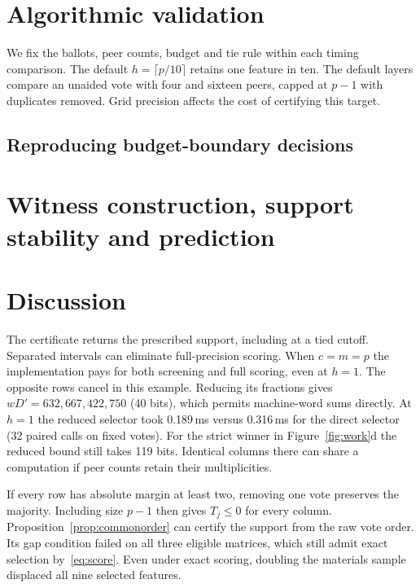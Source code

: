 \documentclass{article}
\begin{document}


\section{Algorithmic validation}
We fix the ballots, peer counts, budget and tie rule within each timing comparison. The default $h=\lceil p/10\rceil$ retains one feature in ten. The default layers compare an unaided vote with four and sixteen peers, capped at $p-1$ with duplicates removed. Grid precision affects the cost of certifying this target.

\subsection{Reproducing budget-boundary decisions}\label{sec:boundary}













\section{Witness construction, support stability and prediction}






\section{Discussion}
The certificate returns the prescribed support, including at a tied cutoff. Separated intervals can eliminate full-precision scoring. When $c=m=p$ the implementation pays for both screening and full scoring, even at $h=1$. The opposite rows cancel in this example. Reducing its fractions gives $wD'=632{,}667{,}422{,}750$ (40 bits), which permits machine-word sums directly. At $h=1$ the reduced selector took 0.189\,ms versus 0.316\,ms for the direct selector (32 paired calls on fixed votes). For the strict winner in Figure~\ref{fig:work}d the reduced bound still takes 119 bits. Identical columns there can share a computation if peer counts retain their multiplicities.

If every row has absolute margin at least two, removing one vote preserves the majority. Including size $p-1$ then gives $T_j\le0$ for every column. Proposition~\ref{prop:commonorder} can certify the support from the raw vote order. Its gap condition failed on all three eligible matrices, which still admit exact selection by~\eqref{eq:score}. Even under exact scoring, doubling the materials sample displaced all nine selected features.
\end{document}
